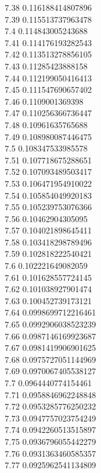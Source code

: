 {7.38	0.116188414807896\\
7.39	0.115513737963478\\
7.4	0.114843005243688\\
7.41	0.114176193282543\\
7.42	0.113513278856105\\
7.43	0.11285423888158\\
7.44	0.112199050416413\\
7.45	0.111547690657402\\
7.46	0.1109001369398\\
7.47	0.110256366736447\\
7.48	0.10961635765688\\
7.49	0.108980087446475\\
7.5	0.108347533985578\\
7.51	0.107718675288651\\
7.52	0.107093489503417\\
7.53	0.106471954910022\\
7.54	0.105854049920183\\
7.55	0.105239753076366\\
7.56	0.10462904305095\\
7.57	0.104021898645411\\
7.58	0.103418298789496\\
7.59	0.102818222540421\\
7.6	0.102221649082059\\
7.61	0.101628557724145\\
7.62	0.101038927901474\\
7.63	0.100452739173121\\
7.64	0.0998699712216461\\
7.65	0.0992906038523239\\
7.66	0.0987146169923687\\
7.67	0.0981419906901625\\
7.68	0.0975727051144969\\
7.69	0.0970067405538127\\
7.7	0.0964440774154461\\
7.71	0.0958846962248848\\
7.72	0.0953285776250232\\
7.73	0.0947757023754249\\
7.74	0.0942260513515897\\
7.75	0.0936796055442279\\
7.76	0.0931363460585357\\
7.77	0.0925962541134809\\
}

